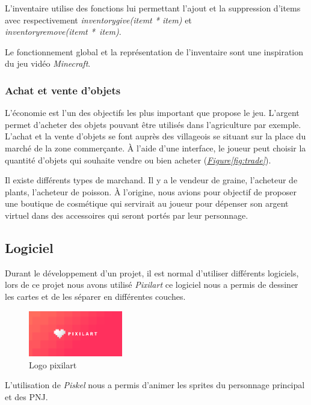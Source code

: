 \documentclass{article}
\begin{document}
       L'inventaire utilise des fonctions lui permettant l'ajout et la suppression d'items avec respectivement \textit{inventory\textunderscore give(item\textunderscore t * item)} et \\ \textit{inventory\textunderscore remove(item\textunderscore t *~item)}. 
        
Le fonctionnement global et la représentation de l'inventaire sont une inspiration du jeu vidéo \textit{Minecraft}.

        \newpage
        
        \subsubsection{Achat et vente d'objets}
L'économie est l'un des objectifs les plus important que propose le jeu. L'argent permet d'acheter des objets pouvant être utilisés dans l'agriculture par exemple. L'achat et la vente d'objets se font auprès des villageois se situant sur la place du marché de la zone commerçante. À l'aide d'une interface, le joueur peut choisir la quantité d'objets qui souhaite vendre ou bien acheter (\textit{\hyperref[fig:trade]{Figure\ref{fig:trade}}}).
        
Il existe différents types de marchand. Il y a le vendeur de graine, l'acheteur de plants, l'acheteur de poisson. À l'origine, nous avions pour objectif de proposer une boutique de cosmétique qui servirait au joueur pour dépenser son argent virtuel dans des accessoires qui seront portés par leur personnage.
\newpage
\subsection{Logiciel}
Durant le développement d'un projet, il est normal d'utiliser différents logiciels, lors de ce projet nous avons utilisé \textit{Pixilart} ce logiciel nous a permis de dessiner les cartes et de les séparer en différentes couches.
    
    \begin{figure}[h]  
        \includegraphics[height = 2cm]{pixilart.png}
        \centering
        \caption{Logo pixilart}
        \label{fig:logo1}
    \end{figure}


    L'utilisation de \textit{Piskel} nous a permis d'animer les sprites du personnage principal et des PNJ.
\end{document}

